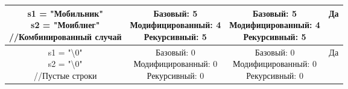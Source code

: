 \begin{center}
\begin{tabular}{|c|c|c|c|}
			\hline
			\makecell{s1 = "Мобильник" \\ s2 = "Моиблнег" \\ //Комбинированный случай} &
			\makecell{Базовый: 5\\Модифицированный: 4\\Рекурсивный: 5} & 
			\makecell{Базовый: 5\\Модифицированный: 4\\Рекурсивный: 5} & Да\\
			
			\hline
			\makecell{s1 = "\textbackslash 0"  \\ s2 = "\textbackslash 0" \\ //Пустые строки} &
			\makecell{Базовый: 0\\Модифицированный: 0\\Рекурсивный: 0} & 
			\makecell{Базовый: 0\\Модифицированный: 0\\Рекурсивный: 0} & Да\\
			
			\hline			
		\end{tabular}
	\end{center}	



	\newpage
	
